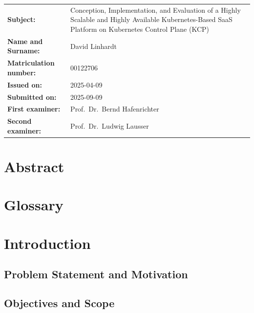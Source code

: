 \documentclass[11pt, a4paper, oneside, draft]{scrartcl}
\newcommand{\thesistitle}{Conception, Implementation, and Evaluation of a Highly Scalable and Highly Available Kubernetes-Based SaaS Platform on Kubernetes Control Plane (KCP)}
\begin{document}
\begin{titlepage}
        \begin{tabularx}{\textwidth}{@{}lX@{}}
            \textbf{Subject:} & \thesistitle \\[2cm]
            \textbf{Name and Surname:} & David Linhardt \\[0.5cm]
            \textbf{Matriculation number:} & 00122706\\[2cm]     
            \textbf{Issued on:} & 2025-04-09 \\[0.5cm]           
            \textbf{Submitted on:} & 2025-09-09 \\[2cm]           
            \textbf{First examiner:} & Prof.\ Dr.\ Bernd Hafenrichter \\[0.5cm]      
            \textbf{Second examiner:} & Prof.\ Dr.\ Ludwig Lausser \\
        \end{tabularx}

    \end{titlepage}

    \restoregeometry


    \section*{Abstract}

    \begingroup
        \tableofcontents
    \endgroup

    \section*{Glossary}


    \section{Introduction}

        \subsection{Problem Statement and Motivation}



        \subsection{Objectives and Scope}
\end{document}
